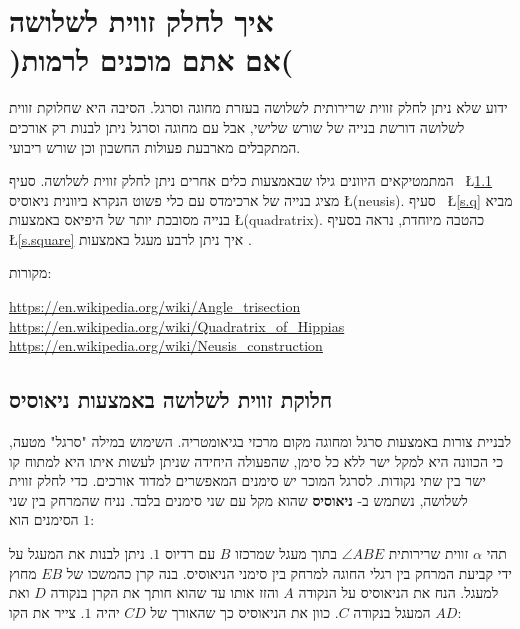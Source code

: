 
\chapter[\R{ איך לחלק זווית לשלושה )אם אתם מוכנים לרמות( }]%
{איך לחלק זווית לשלושה\\)אם אתם מוכנים לרמות(}
\label{c.trisect-an-angle}


ידוע שלא ניתן לחלק זווית שרירותית לשלושה בעזרת מחוגה וסרגל. הסיבה היא שחלוקת זווית לשלושה דורשת בנייה של שורש שלישי, אבל עם מחוגה וסרגל ניתן לבנות רק אורכים המתקבלים מארבעת פעולות החשבון וכן שורש ריבועי.

המתמטיקאים היוונים גילו שבאמצעות כלים אחרים ניתן לחלק זווית לשלושה. סעיף~%
\L{\ref{s.neusis}}
מציג בנייה של ארכימדס עם כלי פשוט הנקרא ביוונית ניאוסיס
\L{(neusis)}.
סעיף~%
\L{\ref{s.q}}
מביא בנייה מסובכת יותר של היפיאס באמצעות
\qd{}
\L{(quadratrix)}.
כהטבה מיוחדת, נראה בסעיף~%
\L{\ref{s.square}}
איך ניתן לרבע מעגל באמצעות 
\qd{}.


מקורות:

\noindent\url{https://en.wikipedia.org/wiki/Angle_trisection}\\
\url{https://en.wikipedia.org/wiki/Quadratrix_of_Hippias}\\
\url{https://en.wikipedia.org/wiki/Neusis_construction}

\vspace{-2ex}


\section{חלוקת זווית לשלושה באמצעות ניאוסיס}\label{s.neusis}

לבניית צורות באמצעות סרגל ומחוגה מקום מרכזי בגיאומטריה. השימוש במילה "סרגל" מטעה, כי הכוונה היא למקל ישר ללא כל סימן, שהפעולה היחידה שניתן לעשות איתו היא למתוח קו ישר בין שתי נקודות. לסרגל המוכר יש סימנים המאפשרים למדוד אורכים. כדי לחלק זווית לשלושה, נשתמש ב-%
\textbf{ניאוסיס}
שהוא מקל עם שני סימנים בלבד. נניח שהמרחק בין שני הסימנים הוא
$1$:
\begin{center}
\end{center}
תהי 
$\alpha$
זווית שרירותית
$\angle ABE$
בתוך מעגל שמרכזו
$B$
עם רדיוס
$1$.
ניתן לבנות את המעגל על ידי קביעת המרחק בין רגלי החוגה למרחק בין סימני הניאוסיס. בנה קרן כהמשכו של 
$EB$
מחוץ למעגל. הנח את הניאוסיס על הנקודה
$A$
והזז אותו עד שהוא חותך את הקרן בנקודה 
$D$
ואת המעגל בנקודה
$C$.
כוון את הניאוסיס כך שהאורך של
$CD$
יהיה
$1$.
צייר את הקו
$AD$:


